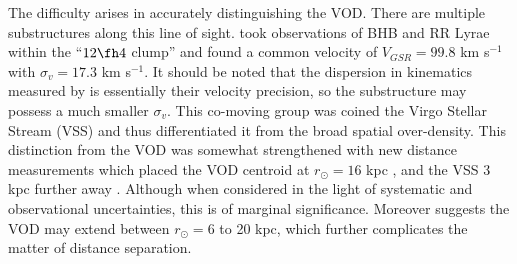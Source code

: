 \documentclass[preprint2]{aastex}
\begin{document}
	
	
The difficulty arises in accurately distinguishing the VOD. There are multiple substructures along this line of sight. \citet{Duffau;et-al_2006} took observations of BHB and RR Lyrae within the ``$12\fh4$ clump'' and found a common velocity of $V_{GSR} = 99.8$ km s$^{-1}$ with $\sigma_{v} = 17.3$ km s$^{-1}$. It should be noted that the dispersion in kinematics measured by \citet{Duffau;et-al_2006} is essentially their velocity precision, so the substructure may possess a much smaller $\sigma_v$. This co-moving group was coined the Virgo Stellar Stream (VSS) and thus differentiated it from the broad spatial over-density. This distinction from the VOD was somewhat strengthened with new distance measurements which placed the VOD centroid at $r_\odot = 16$ kpc \citep{Juric;et-al_2008, Keller_2010}, and the VSS 3 kpc further away \citep{Duffau;et-al_2006}. Although when considered in the light of systematic and observational uncertainties, this is of marginal significance. Moreover \citet{Juric;et-al_2008} suggests the VOD may extend between $r_\odot = 6$ to 20 kpc, which further complicates the matter of distance separation.
 
\end{document}

